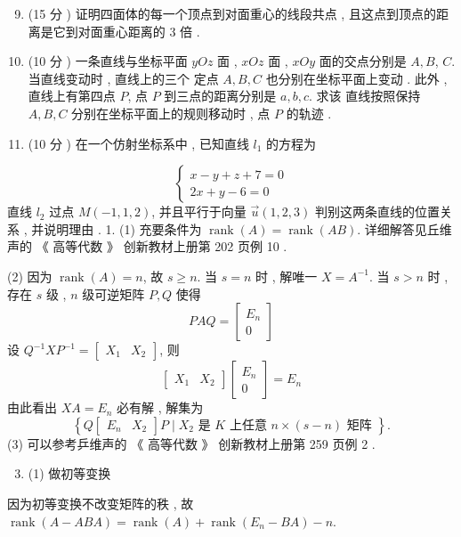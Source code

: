 \documentclass[10pt]{article}
\begin{document}
\begin{enumerate}
  \setcounter{enumi}{8}
  \item (15  分 )  证明四面体的每一个顶点到对面重心的线段共点 ,  且这点到顶点的距离是它到对面重心距离的  3  倍 .

  \item (10  分 )  一条直线与坐标平面  $y O z$  面 , $x O z$  面 , $x O y$  面的交点分别是  $A, B$, $C$.  当直线变动时 ,  直线上的三个   定点  $A, B, C$  也分别在坐标平面上变动 .  此外 ,  直线上有第四点  $P$,  点  $P$  到三点的距离分别是  $a, b, c$.  求该   直线按照保持  $A, B, C$  分别在坐标平面上的规则移动时 ,  点  $P$  的轨迹 .

  \item (10  分 )  在一个仿射坐标系中 ,  已知直线  $l_{1}$  的方程为 

\end{enumerate}
$$
\left\{\begin{array}{r}
x-y+z+7=0 \\
2 x+y-6=0
\end{array}\right.
$$
 直线  $l_{2}$  过点  $M(-1,1,2)$,  并且平行于向量  $\vec{u}(1,2,3)$  判别这两条直线的位置关系 ,  并说明理由 . 1. (1)  充要条件为  $\operatorname{rank}(A)=\operatorname{rank}(A B)$.  详细解答见丘维声的 《 高等代数 》 创新教材上册第  202  页例  10 .

(2)  因为  $\operatorname{rank}(A)=n$,  故  $s \geq n$.  当  $s=n$  时 ,  解唯一  $X=A^{-1}$.  当  $s>n$  时 ,  存在  $s$  级 , $n$  级可逆矩阵  $P, Q$  使得 
$$
P A Q=\left[\begin{array}{c}
E_{n} \\
0
\end{array}\right]
$$
 设  $Q^{-1} X P^{-1}=\left[\begin{array}{ll}X_{1} & X_{2}\end{array}\right]$,  则 
$$
\left[\begin{array}{ll}
X_{1} & X_{2}
\end{array}\right]\left[\begin{array}{c}
E_{n} \\
0
\end{array}\right]=E_{n}
$$
 由此看出  $X A=E_{n}$  必有解 ,  解集为 
$$
\left\{Q\left[\begin{array}{ll}
E_{n} & X_{2}
\end{array}\right] P \mid X_{2} \text { 是 } K \text { 上任意 } n \times(s-n) \text { 矩阵 }\right\} .
$$
(3)  可以参考乒维声的 《 高等代数 》 创新教材上册第  259  页例  2 .

\begin{enumerate}
  \setcounter{enumi}{2}
  \item (1)  做初等变换 
\end{enumerate}
 因为初等变换不改变矩阵的秩 ,  故  $\operatorname{rank}(A-A B A)=\operatorname{rank}(A)+\operatorname{rank}\left(E_{n}-B A\right)-n$.
\end{document}
